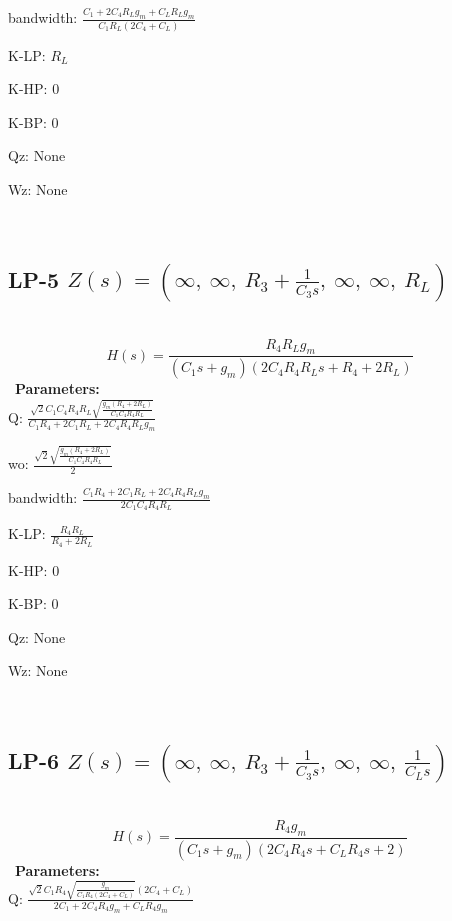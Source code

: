 \documentclass{article}
\begin{document}
bandwidth: $\frac{C_{1} + 2 C_{4} R_{L} g_{m} + C_{L} R_{L} g_{m}}{C_{1} R_{L} \left(2 C_{4} + C_{L}\right)}$\ 

K-LP: $R_{L}$\ 

K-HP: $0$\ 

K-BP: $0$\ 

Qz: $\text{None}$\ 

Wz: $\text{None}$\ 

\ 

\subsection{LP-5 $Z(s) = \left( \infty, \  \infty, \  R_{3} + \frac{1}{C_{3} s}, \  \infty, \  \infty, \  R_{L}\right)$ } \ 
\textbf{\[H(s) = \frac{R_{4} R_{L} g_{m}}{\left(C_{1} s + g_{m}\right) \left(2 C_{4} R_{4} R_{L} s + R_{4} + 2 R_{L}\right)}\] } \ 
\textbf{Parameters:}\\ 

Q: $\frac{\sqrt{2} C_{1} C_{4} R_{4} R_{L} \sqrt{\frac{g_{m} \left(R_{4} + 2 R_{L}\right)}{C_{1} C_{4} R_{4} R_{L}}}}{C_{1} R_{4} + 2 C_{1} R_{L} + 2 C_{4} R_{4} R_{L} g_{m}}$\ 

wo: $\frac{\sqrt{2} \sqrt{\frac{g_{m} \left(R_{4} + 2 R_{L}\right)}{C_{1} C_{4} R_{4} R_{L}}}}{2}$\ 

bandwidth: $\frac{C_{1} R_{4} + 2 C_{1} R_{L} + 2 C_{4} R_{4} R_{L} g_{m}}{2 C_{1} C_{4} R_{4} R_{L}}$\ 

K-LP: $\frac{R_{4} R_{L}}{R_{4} + 2 R_{L}}$\ 

K-HP: $0$\ 

K-BP: $0$\ 

Qz: $\text{None}$\ 

Wz: $\text{None}$\ 

\ 

\subsection{LP-6 $Z(s) = \left( \infty, \  \infty, \  R_{3} + \frac{1}{C_{3} s}, \  \infty, \  \infty, \  \frac{1}{C_{L} s}\right)$ } \ 
\textbf{\[H(s) = \frac{R_{4} g_{m}}{\left(C_{1} s + g_{m}\right) \left(2 C_{4} R_{4} s + C_{L} R_{4} s + 2\right)}\] } \ 
\textbf{Parameters:}\\ 

Q: $\frac{\sqrt{2} C_{1} R_{4} \sqrt{\frac{g_{m}}{C_{1} R_{4} \left(2 C_{4} + C_{L}\right)}} \left(2 C_{4} + C_{L}\right)}{2 C_{1} + 2 C_{4} R_{4} g_{m} + C_{L} R_{4} g_{m}}$\ 
\end{document}

